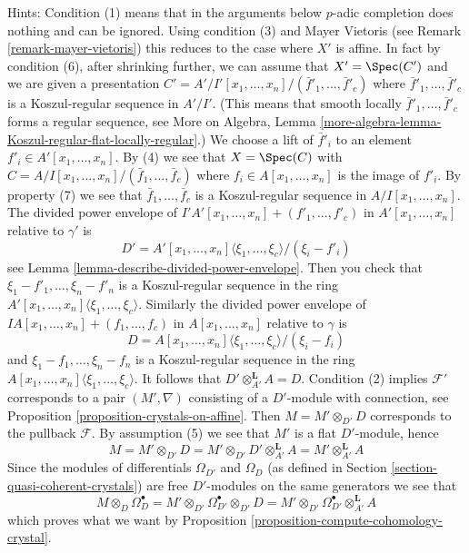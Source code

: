 \begin{remark}
\medskip\noindent
Hints: Condition (1) means that in the arguments below $p$-adic completion
does nothing and can be ignored.
Using condition (3) and Mayer Vietoris (see
Remark \ref{remark-mayer-vietoris}) this reduces to the case
where $X'$ is affine. In fact by condition (6), after shrinking
further, we can assume that $X' = \Spec(C')$ and we are given a presentation
$C' = A'/I'[x_1, \ldots, x_n]/(\bar f'_1, \ldots, \bar f'_c)$
where $\bar f'_1, \ldots, \bar f'_c$ is a Koszul-regular sequence in $A'/I'$.
(This means that smooth locally $\bar f'_1, \ldots, \bar f'_c$ forms
a regular sequence, see More on Algebra,
Lemma \ref{more-algebra-lemma-Koszul-regular-flat-locally-regular}.)
We choose a lift of
$\bar f'_i$ to an element $f'_i \in A'[x_1, \ldots, x_n]$. By (4) we see that
$X = \Spec(C)$ with $C = A/I[x_1, \ldots, x_n]/(\bar f_1, \ldots, \bar f_c)$
where $f_i \in A[x_1, \ldots, x_n]$ is the image of $f'_i$.
By property (7) we see that $\bar f_1, \ldots, \bar f_c$ is a Koszul-regular
sequence in $A/I[x_1, \ldots, x_n]$. The divided power envelope of
$I'A'[x_1, \ldots, x_n] + (f'_1, \ldots, f'_c)$ in $A'[x_1, \ldots, x_n]$
relative to $\gamma'$ is
$$
D' = A'[x_1, \ldots, x_n]\langle \xi_1, \ldots, \xi_c \rangle/(\xi_i - f'_i)
$$
see Lemma \ref{lemma-describe-divided-power-envelope}. Then you check that
$\xi_1 - f'_1, \ldots, \xi_n - f'_n$ is a Koszul-regular sequence in the
ring $A'[x_1, \ldots, x_n]\langle \xi_1, \ldots, \xi_c\rangle$.
Similarly the divided power envelope of
$IA[x_1, \ldots, x_n] + (f_1, \ldots, f_c)$ in $A[x_1, \ldots, x_n]$
relative to $\gamma$ is
$$
D = A[x_1, \ldots, x_n]\langle \xi_1, \ldots, \xi_c\rangle/(\xi_i - f_i)
$$
and $\xi_1 - f_1, \ldots, \xi_n - f_n$ is a Koszul-regular sequence in the
ring $A[x_1, \ldots, x_n]\langle \xi_1, \ldots, \xi_c\rangle$.
It follows that $D' \otimes_{A'}^\mathbf{L} A = D$. Condition (2)
implies $\mathcal{F}'$ corresponds to a pair $(M', \nabla)$
consisting of a $D'$-module with connection, see
Proposition \ref{proposition-crystals-on-affine}.
Then $M = M' \otimes_{D'} D$ corresponds to the pullback $\mathcal{F}$.
By assumption (5) we see that $M'$ is a flat $D'$-module, hence
$$
M = M' \otimes_{D'} D = M' \otimes_{D'} D' \otimes_{A'}^\mathbf{L} A
= M' \otimes_{A'}^\mathbf{L} A
$$
Since the modules of differentials $\Omega_{D'}$ and $\Omega_D$
(as defined in Section \ref{section-quasi-coherent-crystals})
are free $D'$-modules on the same generators we see that
$$
M \otimes_D \Omega^\bullet_D =
M' \otimes_{D'} \Omega^\bullet_{D'} \otimes_{D'} D =
M' \otimes_{D'} \Omega^\bullet_{D'} \otimes_{A'}^\mathbf{L} A
$$
which proves what we want by
Proposition \ref{proposition-compute-cohomology-crystal}.
\end{remark}

